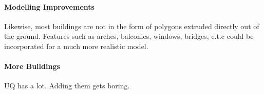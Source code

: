         \paragraph{Modelling Improvements} %
        \label{par:modelling_improvements}
            Likewise, most buildings are not in the form of polygons extruded directly out of the ground.
            Features such as arches, balconies, windows, bridges, e.t.c could be incorporated for a much more realistic model.

        \paragraph{More Buildings} %
        \label{par:more_buildings}
            UQ has a lot. Adding them gets boring.


